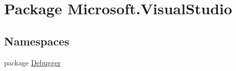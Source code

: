 \hypertarget{namespace_microsoft_1_1_visual_studio}{\section{Package Microsoft.\+Visual\+Studio}
\label{namespace_microsoft_1_1_visual_studio}
}
\subsection*{Namespaces}
\begin{DoxyCompactItemize}
\item 
package \hyperlink{namespace_microsoft_1_1_visual_studio_1_1_debugger}{Debugger}
\end{DoxyCompactItemize}
